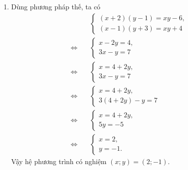 \begin{bt}[1,5 điểm]
{\begin{enumerate}
\item Dùng phương pháp thế, ta có
\begin{align*}
&\begin{cases}
(x+2)(y-1)=xy-6,\\
(x-1)(y+3)=xy+4
\end{cases}\\[0.7em]
\Leftrightarrow\quad
&\begin{cases}
x-2y=4,\\
3x-y=7
\end{cases}\\[0.7em]
\Leftrightarrow\quad
&\begin{cases}
x=4+2y,\\
3x-y=7
\end{cases}\\[0.7em]
\Leftrightarrow\quad
&\begin{cases}
x=4+2y,\\
3(4+2y)-y=7
\end{cases}\\[0.7em]
\Leftrightarrow\quad
&\begin{cases}
x=4+2y,\\
5y=-5
\end{cases}\\[0.7em]
\Leftrightarrow\quad
&\begin{cases}
x=2,\\
y=-1.
\end{cases}
\end{align*}
Vậy hệ phương trình có nghiệm $(x;y)=(2;-1)$.
\end{enumerate}
}
\end{bt}



